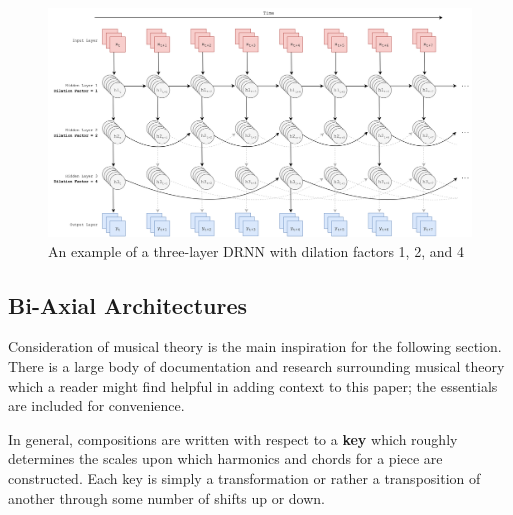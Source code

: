 \documentclass[12pt,]{article}
\begin{document}
\begin{figure}
\centering
\includegraphics[width=1\textwidth,height=\textheight]{Images/dilatedrnn.png}
\caption{An example of a three-layer DRNN with dilation factors 1, 2,
and 4}
\end{figure}

\hypertarget{bi-axial-architectures}{%
\subsection{Bi-Axial Architectures}\label{bi-axial-architectures}}

Consideration of musical theory is the main inspiration for the
following section. There is a large body of documentation and research
surrounding musical theory which a reader might find helpful in adding
context to this paper; the essentials are included for convenience.

In general, compositions are written with respect to a \textbf{key}
which roughly determines the scales upon which harmonics and chords for
a piece are constructed. Each key is simply a transformation or rather a
transposition of another through some number of shifts up or down.
\end{document}
